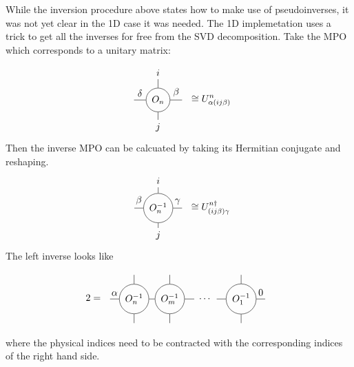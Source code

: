 

While the inversion procedure above states how to make use of pseudoinverses, it was not yet clear in the 1D case it was needed. The 1D implemetation uses a trick to get all the inverses for free from the SVD decomposition. Take the MPO which corresponds to a unitary matrix:




\begin{equation}
    \mpo{1}{ {"$\delta$","$\beta$",}  }{ { "$i$",}}{ { "$j$",}}{}{ {"$O_n$",} } \cong U^{n}_{\alpha (i j \beta)}
\end{equation}
Then the inverse MPO can be calcuated by taking its Hermitian conjugate and reshaping.
\begin{equation}
    \mpo{1}{ {"$\beta$","$\gamma$",}  }{ { "$i$",}}{ { "$j$",}}{}{ {"$O^{-1}_n$",} } \cong U^{n \dagger}_{ (i j \beta)  \gamma }
\end{equation}
The left inverse looks like
\begin{equation}
    2 =  \mpo{4}{ {"$\alpha$",,,,0}  }{ {,,,,,}}{ { ,,,,,}}{{0,0,1,0}}{{"$O^{-1}_n$","$O^{-1}_m$",,"$O^{-1}_1$",} }
\end{equation}
where the physical indices need to be contracted with the corresponding indices of the right hand side.

